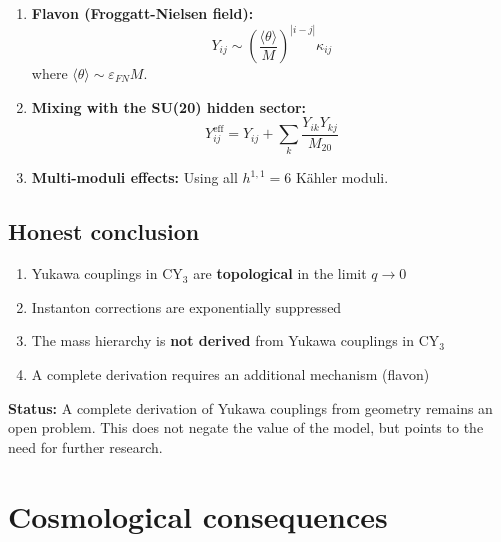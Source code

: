 \documentclass[12pt,a4paper,twoside]{article}
\newcommand{\EPS}{\varepsilon}
\theoremstyle{definition}
\begin{document}
\begin{enumerate}
    \item \textbf{Flavon (Froggatt-Nielsen field):}
    \begin{equation}
    Y_{ij} \sim \left(\frac{\langle \theta \rangle}{M}\right)^{|i-j|} \kappa_{ij}
    \end{equation}
    where $\langle \theta \rangle \sim \EPS_{FN} M$.
    
    \item \textbf{Mixing with the SU(20) hidden sector:}
    \begin{equation}
    Y_{ij}^{\text{eff}} = Y_{ij} + \sum_k \frac{Y_{ik} Y_{kj}}{M_{20}}
    \end{equation}
    
    \item \textbf{Multi-moduli effects:} Using all $h^{1,1} = 6$ Kähler moduli.
\end{enumerate}

\subsection{Honest conclusion}

\begin{tcolorbox}[
  enhanced,
  colback=lightgray,
  colframe=bordeaux,
  boxrule=0.8pt,
  arc=4pt,
  title={\bfseries Result of the Yukawa coupling analysis},
  coltitle=white,
  colbacktitle=bordeaux,
  breakable
]
\begin{enumerate}
    \item Yukawa couplings in CY$_3$ are \textbf{topological} in the limit $q \to 0$
    \item Instanton corrections are exponentially suppressed
    \item The mass hierarchy is \textbf{not derived} from Yukawa couplings in CY$_3$
    \item A complete derivation requires an additional mechanism (flavon)
\end{enumerate}
\end{tcolorbox}

\textbf{Status:} A complete derivation of Yukawa couplings from geometry remains an open problem. This does not negate the value of the model, but points to the need for further research.

\section{Cosmological consequences}
\label{sec:cosmology}
\end{document}

